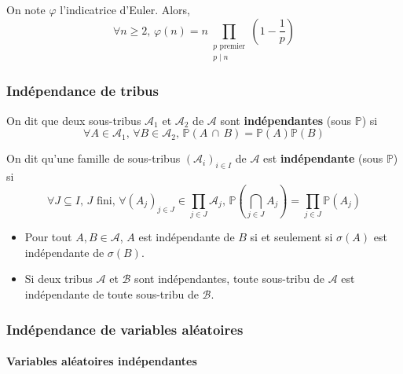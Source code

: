   \begin{application}
    On note $\varphi$ l'indicatrice d'Euler. Alors,
    \[ \forall n \geq 2, \, \varphi(n) = n \prod_{\substack{p \text{ premier} \\ p \mid n}} \left( 1 - \frac{1}{p} \right) \]
  \end{application}

  \subsubsection{Indépendance de tribus}


  \begin{definition}
    On dit que deux sous-tribus $\mathcal{A}_1$ et $\mathcal{A}_2$ de $\mathcal{A}$ sont \textbf{indépendantes} (sous $\mathbb{P}$) si
    \[ \forall A \in \mathcal{A}_1, \, \forall B \in \mathcal{A}_2, \, \mathbb{P}(A \, \cap \, B) = \mathbb{P}(A) \mathbb{P}(B) \]
  \end{definition}

  \begin{definition}
    On dit qu'une famille de sous-tribus $(\mathcal{A}_i)_{i \in I}$ de $\mathcal{A}$ est \textbf{indépendante} (sous $\mathbb{P}$) si
    \[ \forall J \subseteq I, \, J \text{ fini}, \, \forall (A_j)_{j \in J} \in \prod_{j \in J} \mathcal{A}_j, \, \mathbb{P}\left( \bigcap_{j \in J} A_j \right) = \prod_{j \in J} \mathbb{P}(A_j) \]
  \end{definition}

  \begin{remark}
    \begin{itemize}
      \item Pour tout $A, B \in \mathcal{A}$, $A$ est indépendante de $B$ si et seulement si $\sigma(A)$ est indépendante de $\sigma(B)$.
      \item Si deux tribus $\mathcal{A}$ et $\mathcal{B}$ sont indépendantes, toute sous-tribu de $\mathcal{A}$ est indépendante de toute sous-tribu de $\mathcal{B}$.
    \end{itemize}
  \end{remark}

  \subsubsection{Indépendance de variables aléatoires}

  \paragraph{Variables aléatoires indépendantes}

